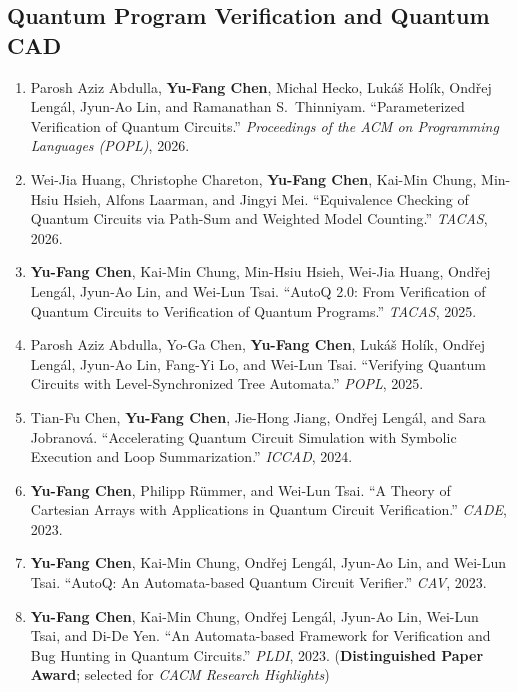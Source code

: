 \documentclass[11pt,a4paper]{article}
\newcommand{\myname}{\textbf{Yu-Fang Chen}}
\begin{document}
\subsection*{Quantum Program Verification and Quantum CAD}
\begin{enumerate}[leftmargin=1.6em,itemsep=0.45em]
  \item Parosh Aziz Abdulla, \myname, Michal Hecko, Lukáš Holík,
  Ondřej Lengál, Jyun-Ao Lin, and Ramanathan S.\ Thinniyam.
  ``Parameterized Verification of Quantum Circuits.''
  \emph{Proceedings of the ACM on Programming Languages (POPL)}, 2026.

  \item Wei-Jia Huang, Christophe Chareton, \myname, Kai-Min Chung,
  Min-Hsiu Hsieh, Alfons Laarman, and Jingyi Mei.
  ``Equivalence Checking of Quantum Circuits via Path-Sum and Weighted Model Counting.''
  \emph{TACAS}, 2026.

  \item \myname, Kai-Min Chung, Min-Hsiu Hsieh, Wei-Jia Huang,
  Ondřej Lengál, Jyun-Ao Lin, and Wei-Lun Tsai.
  ``AutoQ 2.0: From Verification of Quantum Circuits to Verification of Quantum Programs.''
  \emph{TACAS}, 2025.

  \item Parosh Aziz Abdulla, Yo-Ga Chen, \myname, Lukáš Holík,
  Ondřej Lengál, Jyun-Ao Lin, Fang-Yi Lo, and Wei-Lun Tsai.
  ``Verifying Quantum Circuits with Level-Synchronized Tree Automata.''
  \emph{POPL}, 2025.

  \item Tian-Fu Chen, \myname, Jie-Hong Jiang, Ondřej Lengál, and
  Sara Jobranová.
  ``Accelerating Quantum Circuit Simulation with Symbolic Execution and Loop Summarization.''
  \emph{ICCAD}, 2024.

  \item \myname, Philipp Rümmer, and Wei-Lun Tsai.
  ``A Theory of Cartesian Arrays with Applications in Quantum Circuit Verification.''
  \emph{CADE}, 2023.

  \item \myname, Kai-Min Chung, Ondřej Lengál, Jyun-Ao Lin, and Wei-Lun Tsai.
  ``AutoQ: An Automata-based Quantum Circuit Verifier.''
  \emph{CAV}, 2023.

  \item \myname, Kai-Min Chung, Ondřej Lengál, Jyun-Ao Lin, Wei-Lun Tsai,
  and Di-De Yen.
  ``An Automata-based Framework for Verification and Bug Hunting in Quantum Circuits.''
  \emph{PLDI}, 2023.
  (\textbf{Distinguished Paper Award}; selected for \emph{CACM Research Highlights})
\end{enumerate}
\end{document}
